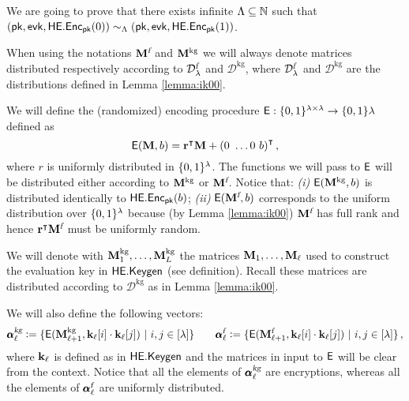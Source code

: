 We are going to prove that there exists infinite $\Lambda \subseteq \mathbb{N}$ such that $(\mathsf{pk},\mathsf{evk}, \mathsf{HE.Enc}_{\mathsf{pk}}(0)) \sim_{\Lambda} (\mathsf{pk},\mathsf{evk}, \mathsf{HE.Enc}_{\mathsf{pk}}(1))$.

When using the notations $\mathbf{M}^{\mathcal{{\textsl{f}}}}$ and $\mathbf{M}^{\text{kg}}$ we will always denote matrices distributed respectively according to $\mathcal{D}^{{\textsl{f}}}_{\lambda}$ and  $\mathcal{D}^{\text{kg}}$, where $\mathcal{D}^{{\textsl{f}}}_{\lambda}$ and $\mathcal{D}^{\text{kg}}$ are the distributions defined in Lemma \ref{lemma:ik00}.



We will define the (randomized) encoding procedure $\mathsf{E} : \{0, 1\}^{\lambda \times \lambda} \to \{0, 1\}{\lambda}$ defined as 
\[
    \mathsf{E}(\mathbf{M}, b) = {\mathbf{r}}^{\intercal} \mathbf{M} + {(0 \ \dots 0 \ b)}^{\intercal} \, ,
\]
where $r$ is uniformly distributed in $\{0, 1\}^{\lambda}$. The functions we will pass to $\mathsf{E}$ will be distributed either according to $\mathbf{M}^{\text{kg}}$ or $\mathbf{M}^{\mathcal{{\textsl{f}}}}$. Notice that: \textit{(i)}  $\mathsf{E}(\mathbf{M}^{\text{kg}}, b)$ is distributed identically to $\mathsf{HE.Enc}_{\mathsf{pk}}(b)$; \textit{(ii)} $\mathsf{E}(\mathbf{M}^{\mathcal{{\textsl{f}}}}, b)$ corresponds to the uniform distribution over $\{0, 1\}^{\lambda}$ because (by Lemma \ref{lemma:ik00}) $\mathbf{M}^{\mathcal{{\textsl{f}}}}$ has full rank and hence ${\mathbf{r}}^{\intercal}\mathbf{M}^{\mathcal{{\textsl{f}}}}$ must be uniformly random.

We will denote with $\mathbf{M}^{\text{kg}}_1, \dots, \mathbf{M}^{\text{kg}}_{L}$  the matrices $\mathbf{M}_1, \dots, \mathbf{M}_{\ell}$ used to construct the evaluation key in $\mathsf{HE.Keygen}$ (see definition). Recall these matrices are distributed according to $\mathcal{D}^{\text{kg}}$ as in Lemma \ref{lemma:ik00}.

We will also define the following vectors:
\[
\pmb{\alpha}^{{\textsl{kg}}}_{\ell} \vcentcolon= \{ \mathsf{E}(\mathbf{M}^{\text{kg}}_{\ell+1}, \mathbf{k}_{\ell}[i] \cdot \mathbf{k}_{\ell}[j]) \ | \ i,j \in [\lambda] \} \qquad \pmb{\alpha}^{{\textsl{f}}}_{\ell} \vcentcolon= \{ \mathsf{E}(\mathbf{M}^{\mathcal{{\textsl{f}}}}_{\ell+1}, \mathbf{k}_{\ell}[i] \cdot \mathbf{k}_{\ell}[j]) \ | \ i,j \in [\lambda] \} \, ,
\]
where $\mathbf{k}_{\ell}$ is defined as in $\mathsf{HE.Keygen}$ and the matrices in input to $\mathsf{E}$ will be clear from the context. Notice that all the elements of $\pmb{\alpha}^{{\textsl{kg}}}_{\ell}$ are encryptions, whereas all the elements of $\pmb{\alpha}^{{\textsl{f}}}_{\ell}$ are uniformly distributed.

